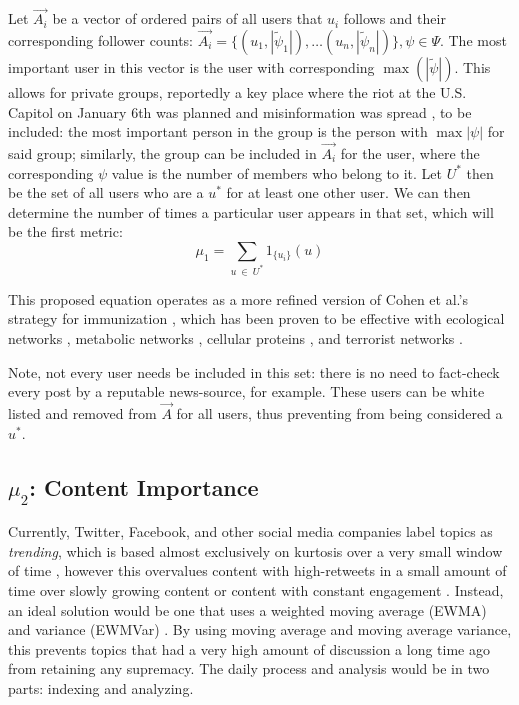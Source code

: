 \documentclass[preprint,12pt]{elsarticle}
\begin{document}
Let $\vec{A_i}$ be a vector of ordered pairs of all users that $u_i$ follows and their corresponding follower counts:
$\vec{A_i}=\{(u_1,|\tilde{\psi}_1|),\dots (u_n,|\tilde{\psi}_n|)\}, \psi \in \Psi$. The most important user in this vector is the user with corresponding $\max(|\tilde{\psi}|)$. This allows for private groups, reportedly a key place where the riot at the U.S. Capitol on January 6th was planned and misinformation was spread \cite{yin2021facebook,horwitz2020facebook}, to be included: the most important person in the group is the person with  $\max|\psi|$ for said group; similarly, the group can be included in $\vec{A_i}$ for the user, where the corresponding $\psi$ value is the number of members who belong to it. Let $U^*$ then be the set of all users who are a $u^*$ for at least one other user. We can then determine the number of times a particular user appears in that set, which will be the first metric: 
\begin{equation}
\label{mu_1 equation}
    \mu_1 = \sum_{u\ \in \ U^*}1_{\{u_i\}}(u)
\end{equation}

This proposed equation operates as a more refined version of Cohen et al.'s strategy for immunization \cite{cohen2003efficient}, which has been proven to be effective with ecological networks \cite{sole2001complexity,camacho2002robust}, metabolic networks \cite{jeong2000large}, cellular proteins \cite{jeong2001lethality}, and terrorist networks \cite{cohen2003efficient}. 

Note, not every user needs be included in this set: there is no need to fact-check every post by a reputable news-source, for example. These users can be white listed and removed from $\vec{A}$ for all users, thus preventing from being considered a $u^*$.

\subsection{$\mu_2$: Content Importance}
\label{mu2}
Currently, Twitter, Facebook, and other social media companies label topics as \textit{trending}, which is based almost exclusively on kurtosis over a very small window of time \cite{dewey2015freddie,lotan2015freddie}, however this overvalues content with high-retweets in a small amount of time over slowly growing content or content with constant engagement \cite{tufekci2017twitter,tufecki2018democracy,tufekci2017we,tufekci2014online}. Instead, an ideal solution would be one that uses a weighted moving average (EWMA) and variance (EWMVar) \cite{schubert2014signitrend}. By using moving average and moving average variance, this prevents topics that had a very high amount of discussion a long time ago from retaining any supremacy. 
The daily process and analysis would be in two parts: indexing and analyzing.
\end{document}
